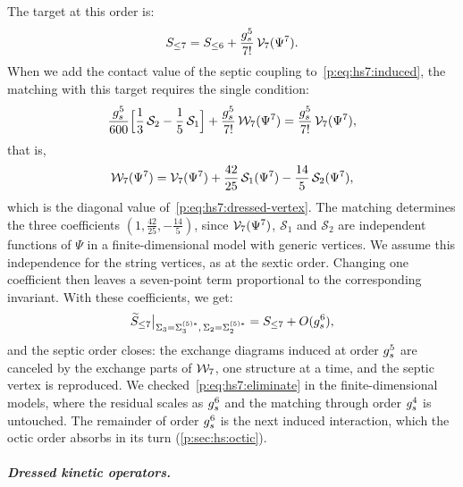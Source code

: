 The target at this order is:
  \begin{equation}
  S_{\le 7}
    = S_{\le 6} + \frac{\gs^5}{7!} \, \vertex{7}(\Psi^7).
\end{equation}
  When we add the contact value of the septic coupling to~\eqref{p:eq:hs7:induced}, the matching with this target requires the single condition:
\begin{equation}
  \label{p:eq:hs7:coefficient}
  \frac{\gs^5}{600} \Big[ \frac{1}{3} \, \mathcal S_2 - \frac{1}{5} \, \mathcal S_1 \Big]
    + \frac{\gs^5}{7!} \, \dvertex{7}(\Psi^7)
    = \frac{\gs^5}{7!} \, \vertex{7}(\Psi^7),
\end{equation}
that is,
\begin{equation}
  \label{p:eq:hs7:diagonal}
  \dvertex{7}(\Psi^7)
    = \vertex{7}(\Psi^7) + \frac{42}{25} \, \mathcal S_1(\Psi^7) - \frac{14}{5} \, \mathcal S_2(\Psi^7),
\end{equation}
which is the diagonal value of~\eqref{p:eq:hs7:dressed-vertex}.
The matching determines the three coefficients $(1, \tfrac{42}{25}, - \tfrac{14}{5})$, since $\vertex{7}(\Psi^7)$, $\mathcal S_1$ and $\mathcal S_2$ are independent functions of $\Psi$ in a finite-dimensional model with generic vertices.
We assume this independence for the string vertices, as at the sextic order.
  Changing one coefficient then leaves a seven-point term proportional to the corresponding invariant.
With these coefficients, we get:
\begin{equation}
  \label{p:eq:hs7:eliminate}
  \caction[\le 7] \big|_{\Sigma_3 = \Sigma_3^{(5)*}, \, \Sigma_2 = \Sigma_2^{(5)*}}
    = S_{\le 7} + O(\gs^6),
\end{equation}
and the septic order closes: the exchange diagrams induced at order $\gs^5$ are canceled by the exchange parts of $\dvertex{7}$, one structure at a time, and the septic vertex is reproduced.
We checked~\eqref{p:eq:hs7:eliminate} in the finite-dimensional models, where the residual scales as $\gs^6$ and the matching through order $\gs^4$ is untouched.
The remainder of order $\gs^6$ is the next induced interaction, which the octic order absorbs in its turn (\cref{p:sec:hs:octic}).

\subparagraph{Dressed kinetic operators.}

